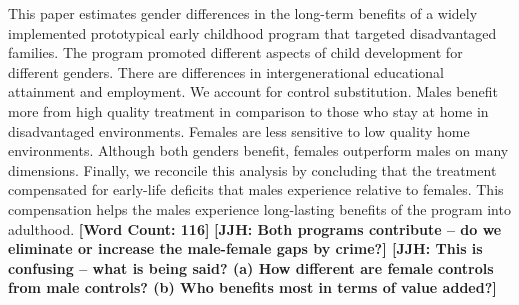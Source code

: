 \noindent This paper estimates gender differences in the long-term benefits of a widely implemented prototypical early childhood program that targeted disadvantaged families. The program promoted different aspects of child development for different genders. There are differences in intergenerational educational attainment and employment. We account for control substitution. Males benefit more from high quality treatment in comparison to those who stay at home in disadvantaged environments. Females are less sensitive to low quality home environments. Although both genders benefit, females outperform males on many dimensions. Finally, we reconcile this analysis by concluding that the treatment compensated for early-life deficits that males experience relative to females. This compensation helps the males experience long-lasting benefits of the program into adulthood. \textbf{[Word Count: 116]} \textbf{[JJH: Both programs contribute -- do we eliminate or increase the male-female gaps by crime?] [JJH: This is confusing -- what is being said? (a) How different are female controls from male controls? (b) Who benefits most in terms of value added?]} 